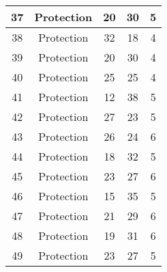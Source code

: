 \documentclass[results.tex]{subfiles}
\begin{document}
\begin{center}
\begin{tabular}{| c || c | c | c | c |}
            \hline
            37                      & Protection                   & 20                     & 30                      & 5                    \\
            \hline
            38                      & Protection                   & 32                     & 18                      & 4                    \\
            \hline
            39                      & Protection                   & 20                     & 30                      & 4                    \\
            \hline
            40                      & Protection                   & 25                     & 25                      & 4                    \\
            \hline
            41                      & Protection                   & 12                     & 38                      & 5                    \\
            \hline
            42                      & Protection                   & 27                     & 23                      & 5                    \\
            \hline
            43                      & Protection                   & 26                     & 24                      & 6                    \\
            \hline
            44                      & Protection                   & 18                     & 32                      & 5                    \\
            \hline
            45                      & Protection                   & 23                     & 27                      & 6                    \\
            \hline
            46                      & Protection                   & 15                     & 35                      & 5                    \\
            \hline
            47                      & Protection                   & 21                     & 29                      & 6                    \\
            \hline
            48                      & Protection                   & 19                     & 31                      & 6                    \\
            \hline
            49                      & Protection                   & 23                     & 27                      & 5                    \\
            \hline
        \end{tabular}
    \end{center}
\end{document}
